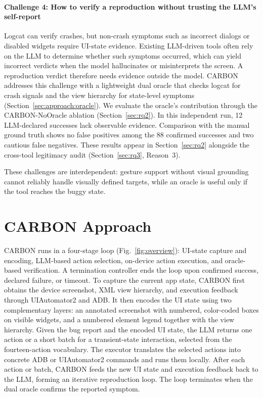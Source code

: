 \documentclass[10pt,conference,a4paper]{IEEEtran}
\begin{document}
  \paragraph*{Challenge 4: How to verify a reproduction without trusting the LLM's self-report}

  Logcat can verify crashes, but non-crash symptoms such as incorrect
  dialogs or disabled widgets require UI-state evidence. Existing LLM-driven tools often rely on the LLM to determine whether such symptoms occurred, which can yield incorrect verdicts when the model hallucinates or misinterprets the screen. A reproduction verdict therefore needs evidence outside the model. CARBON addresses this challenge with a lightweight dual oracle that checks logcat for crash signals and the view hierarchy for state-level symptoms (Section~\ref{sec:approach:oracle}). We evaluate the oracle's contribution through the CARBON-NoOracle ablation (Section~\ref{sec:rq2}). In this independent run, 12 LLM-declared successes lack observable evidence. Comparison with the manual ground truth shows no false positives among the 88 confirmed successes and two cautious false negatives. These results appear in Section~\ref{sec:rq2} alongside the cross-tool legitimacy audit (Section~\ref{sec:rq3}, Reason~3).

  These challenges are interdependent: gesture support without visual
  grounding cannot reliably handle visually defined targets, while an
  oracle is useful only if the tool reaches the buggy state.

  \section{CARBON Approach}
  \label{sec:approach}

  CARBON runs in a four-stage loop (Fig.~\ref{fig:overview}): UI-state capture and encoding, LLM-based action selection, on-device action execution, and oracle-based verification. A termination controller ends the loop upon confirmed success, declared failure, or timeout. To capture the current app state, CARBON first obtains the device screenshot, XML view hierarchy, and execution feedback through UIAutomator2 and ADB. It then encodes the UI state using two complementary layers: an annotated screenshot with numbered, color-coded boxes on visible widgets, and a numbered element legend together with the view hierarchy. Given the bug report and the encoded UI state, the LLM returns one action or a short batch for a transient-state interaction, selected from the fourteen-action vocabulary. The executor translates the selected actions into concrete ADB or UIAutomator2 commands and runs them locally. After each action or batch, CARBON feeds the new UI state and execution feedback back to the LLM, forming an iterative reproduction loop. The loop terminates when the dual oracle confirms the reported symptom.
\end{document}
